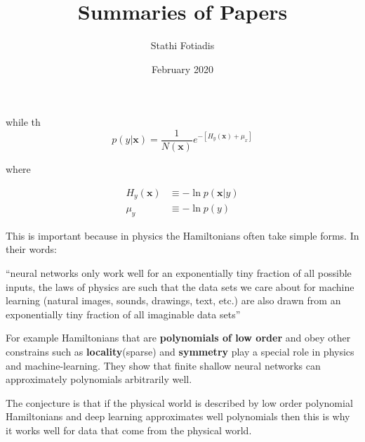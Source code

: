 \documentclass{article}
\title{Summaries of Papers}
\author{Stathi Fotiadis}
\date{February 2020}
\newcommand{\citeall}[1]{\citeauthor{#1}}
\begin{document}
  
\maketitle
  
\tableofcontents
\newpage

\section{\cite{Lin2017WhyWell}}

\cite{Lin2017WhyWell}
\autocite{Lin2017WhyWell}

while th\begin{equation}
p(y | \mathbf{x})=\frac{1}{N(\mathbf{x})} e^{-\left[H_{y}(\mathbf{x})+\mu_{x}\right]}
\end{equation}

where 

\begin{equation}
\begin{aligned} H_{y}(\mathbf{x}) & \equiv-\ln p(\mathbf{x} | y) \\ \mu_{y} & \equiv-\ln p(y) \end{aligned}
\end{equation}

This is important because in physics the Hamiltonians often take simple forms. In their words: 
\begin{displayquote}
“neural networks only work well for an exponentially tiny fraction of all possible inputs, the laws of physics are such that the data sets we care about for machine learning (natural images, sounds, drawings, text, etc.) are also drawn from an exponentially tiny fraction of all imaginable data sets”
\end{displayquote}

For example Hamiltonians that are \textbf{polynomials of low order} and obey other constrains such as \textbf{locality}(sparse) and \textbf{symmetry} play a special role in physics and machine-learning. They show that finite shallow neural networks can approximately polynomials arbitrarily well. 

The conjecture is that if the physical world is described by low order polynomial Hamiltonians and deep learning approximates well polynomials then this is why it works well for data that come from the physical world.


\section{\citeall{Raissi2019Physics-informedEquations}}
\end{document}
